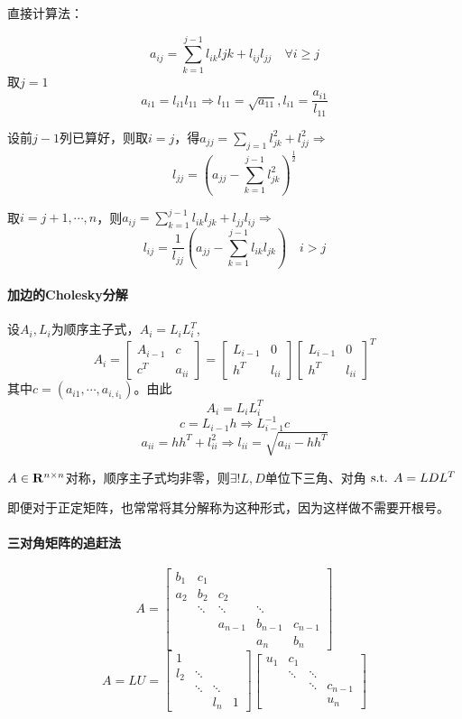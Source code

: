 \documentclass{ctexart}
\begin{document}
直接计算法：

\[a_{ij}=\sum_{k=1}^{j-1}l_{ik}l{jk}+l_{ij}l_{jj}\quad \forall i\geq j\]
取$j=1$
\[a_{i1}=l_{i1}l_{11}\Rightarrow l_{11}=\sqrt{a_{11}},l_{i1}=\frac{a_{i1}}{l_{11}}\]

设前$j-1$列已算好，则取$i=j$，得$a_{jj}=\sum\limits_{j=1}l_{jk}^2+l_{jj}^2\Rightarrow$ \[l_{jj}=(a_{jj}-\sum_{k=1}^{j-1}l^2_{jk})^{\frac 1 2}\]

取$i=j+1,\cdots, n$，则$a_{ij}=\sum_{k=1}^{j-1}l_{ik}l_{jk}+l_{jj}l_{ij}\Rightarrow$
\[l_{ij}=\frac{1}{l_{jj}}(a_{jj}-\sum_{k=1}^{j-1}l_{ik}l_{jk})\quad i>j\]

\paragraph{加边的Cholesky分解}

设$A_i,L_i$为顺序主子式，$A_{i}=L_iL_i^T$,\[A_{i}=\begin{bmatrix}A_{i-1}&c\\c^T&a_{ii}\end{bmatrix}=\begin{bmatrix}L_{i-1}&0\\h^T&l_{ii}\end{bmatrix}\begin{bmatrix}L_{i-1}&0\\h^T&l_{ii}\end{bmatrix}^T\] 其中$c=(a_{i1},\cdots, a_{i,i_1})$。由此
\[A_{i}=L_iL_i^T\]
\[c=L_{i-1}h\Rightarrow L_{i-1}^{-1}c\]
\[a_{ii}=hh^T+l^2_{ii}\Rightarrow l_{ii}=\sqrt{a_{ii}-hh^T}\]

\begin{Thm}
$A\in\mathbf{R}^{n\times n}$对称，顺序主子式均非零，则$\exists !L,D$单位下三角、对角$\text{ s.t. } A=LDL^T$
\end{Thm}
即便对于正定矩阵，也常常将其分解称为这种形式，因为这样做不需要开根号。

\paragraph{三对角矩阵的追赶法}
\[A=\begin{bmatrix}
b_1&c_1&&&\\
a_2&b_2&c_2&&\\
&\ddots&\ddots&\ddots&\\
&&a_{n-1}&b_{n-1}&c_{n-1}\\
&&&a_n&b_n
\end{bmatrix}\]
\[A=LU=
\begin{bmatrix}
1&&&\\
l_2&\ddots&&\\
&\ddots&\ddots&\\
&&l_n&1
\end{bmatrix}
\begin{bmatrix}
u_1&c_1&&\\
&\ddots&\ddots&\\
&&\ddots&c_{n-1}\\
&&&u_n
\end{bmatrix}
\]
\end{document}
